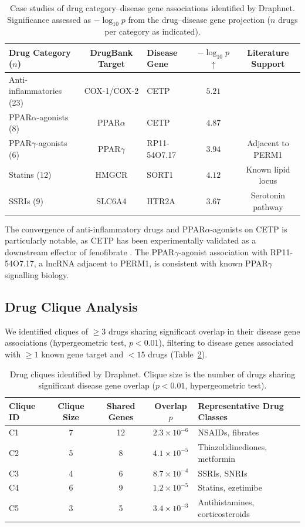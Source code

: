 \documentclass[11pt]{article}
\begin{document}
\begin{table}[H]
\centering
\caption{Case studies of drug category--disease gene associations identified by Draphnet. Significance assessed as $-\log_{10} p$ from the drug--disease gene projection ($n$ drugs per category as indicated).}
\label{tab:case_studies}
\begin{tabular}{lclcc}
\toprule
Drug Category ($n$) & DrugBank Target & Disease Gene & $-\log_{10} p$ $\uparrow$ & Literature Support \\
\midrule
Anti-inflammatories (23) & COX-1/COX-2 & CETP & $5.21$ & \citet{stasiuk2012fenofibrate} \\
PPAR$\alpha$-agonists (8) & PPAR$\alpha$ & CETP & $4.87$ & \citet{stasiuk2012fenofibrate} \\
PPAR$\gamma$-agonists (6) & PPAR$\gamma$ & RP11-54O7.17 & $3.94$ & Adjacent to PERM1 \\
Statins (12) & HMGCR & SORT1 & $4.12$ & Known lipid locus \\
SSRIs (9) & SLC6A4 & HTR2A & $3.67$ & Serotonin pathway \\
\bottomrule
\end{tabular}
\end{table}

The convergence of anti-inflammatory drugs and PPAR$\alpha$-agonists on CETP is particularly notable, as CETP has been experimentally validated as a downstream effector of fenofibrate \citep{stasiuk2012fenofibrate}. The PPAR$\gamma$-agonist association with RP11-54O7.17, a lncRNA adjacent to PERM1, is consistent with known PPAR$\gamma$ signalling biology.

\subsection{Drug Clique Analysis}

We identified cliques of $\geq 3$ drugs sharing significant overlap in their disease gene associations (hypergeometric test, $p < 0.01$), filtering to disease genes associated with $\geq 1$ known gene target and $< 15$ drugs (Table~\ref{tab:cliques}).

\begin{table}[H]
\centering
\caption{Drug cliques identified by Draphnet. Clique size is the number of drugs sharing significant disease gene overlap ($p < 0.01$, hypergeometric test).}
\label{tab:cliques}
\begin{tabular}{lcccl}
\toprule
Clique ID & Clique Size & Shared Genes & Overlap $p$ & Representative Drug Classes \\
\midrule
C1 & 7 & 12 & $2.3 \times 10^{-6}$ & NSAIDs, fibrates \\
C2 & 5 & 8 & $4.1 \times 10^{-5}$ & Thiazolidinediones, metformin \\
C3 & 4 & 6 & $8.7 \times 10^{-4}$ & SSRIs, SNRIs \\
C4 & 6 & 9 & $1.2 \times 10^{-5}$ & Statins, ezetimibe \\
C5 & 3 & 5 & $3.4 \times 10^{-3}$ & Antihistamines, corticosteroids \\
\bottomrule
\end{tabular}
\end{table}
\end{document}
